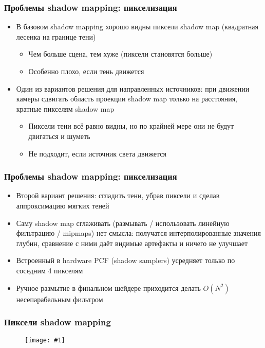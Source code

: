 \documentclass[10pt]{beamer}
\newcommand{\slideimage}[1]{
  \begin{figure}
    \begin{adjustbox}{width=\textwidth, totalheight=\textheight-2\baselineskip-2\baselineskip,keepaspectratio}
      \texttt{[image: \#1]}
    \end{adjustbox}
  \end{figure}
}
\begin{document}
\begin{frame}[fragile]
\frametitle{Проблемы shadow mapping: пикселизация}
\begin{itemize}
\item В базовом shadow mapping хорошо видны пиксели shadow map (квадратная лесенка на границе тени)
\pause
\begin{itemize}
\item Чем больше сцена, тем хуже (пиксели становятся больше)
\pause
\item Особенно плохо, если тень движется
\end{itemize}
\pause
\item Один из вариантов решения для направленных источников: при движении камеры сдвигать область проекции shadow map только на расстояния, кратные пикселям shadow map
\pause
\begin{itemize}
\item Пиксели тени всё равно видны, но по крайней мере они не будут двигаться и шуметь
\pause
\item Не подходит, если источник света движется
\end{itemize}
\end{itemize}
\end{frame}

\begin{frame}[fragile]
\frametitle{Проблемы shadow mapping: пикселизация}
\begin{itemize}
\item Второй вариант решения: сгладить тени, убрав пиксели и сделав аппроксимацию мягких теней
\pause
\item Саму shadow map сглаживать (размывать / использовать линейную фильтрацию / mipmaps) нет смысла: получатся интерполированные значения глубин, сравнение с ними даёт видимые артефакты и ничего не улучшает
\pause
\item Встроенный в hardware PCF (shadow samplers) усредняет только по соседним 4 пикселям
\pause
\item Ручное размытие в финальном шейдере приходится делать \begin{math}O(N^2)\end{math} несепарабельным фильтром
\end{itemize}
\end{frame}

\begin{frame}[fragile]
\frametitle{Пиксели shadow mapping}
\slideimage{shadow_map_nearest.png}
\end{frame}
\end{document}
